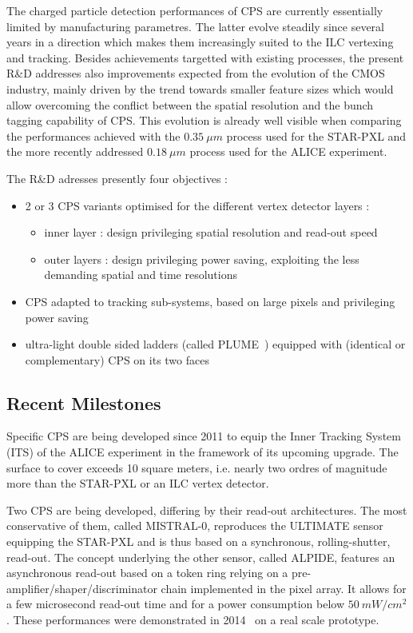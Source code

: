 The charged particle detection performances of CPS are
currently essentially limited by manufacturing parametres.
The latter evolve steadily since several years in a direction which makes
them increasingly suited to the ILC vertexing and tracking. Besides
achievements targetted with existing processes, the present R\&D
addresses also improvements expected from the evolution of the CMOS
industry, mainly driven by the trend towards smaller feature sizes which
would allow overcoming the conflict between the spatial resolution and the
bunch tagging capability of CPS. This evolution is already well visible
when comparing the performances achieved with the $\SI{0.35}{\mu m}$ process
used for the STAR-PXL and the more recently addressed $\SI{0.18}{\mu m}$ process
used for the ALICE experiment.


The R\&D adresses presently four objectives :
\begin{itemize}
\item 2 or 3 CPS variants optimised for the different vertex detector layers :
\begin{itemize}
\item inner layer : design privileging spatial resolution and read-out speed
\item outer layers : design privileging power saving, exploiting the
				less demanding spatial and time resolutions
\end{itemize}
\item CPS adapted to tracking sub-systems, based on large pixels and privileging
power saving
\item ultra-light double sided ladders (called PLUME~\cite{Nomerotski2011208})
equipped with (identical or complementary) CPS on its two faces
\end{itemize}


\subsection{Recent Milestones}
Specific CPS are being developed since 2011 to equip the Inner Tracking
System (ITS) of the ALICE experiment in the framework of its upcoming
upgrade. The surface to cover exceeds 10 square meters, i.e. nearly two
ordres of magnitude more than the STAR-PXL or an ILC vertex detector.

Two CPS are being developed, differing by their read-out architectures.
The most conservative of them, called MISTRAL-0, reproduces the ULTIMATE
sensor equipping the STAR-PXL and is thus based on a synchronous, rolling-shutter, read-out. The concept underlying the other sensor, called ALPIDE, features an asynchronous read-out based on a token ring relying on a pre-amplifier/shaper/discriminator chain implemented in the pixel array. It
allows for a few microsecond read-out time and for a power consumption below
$\SI{50}{mW/cm^2}$. These performances were demonstrated in 2014~\cite{1748-0221-10-03-C03030}
on a real scale prototype.

